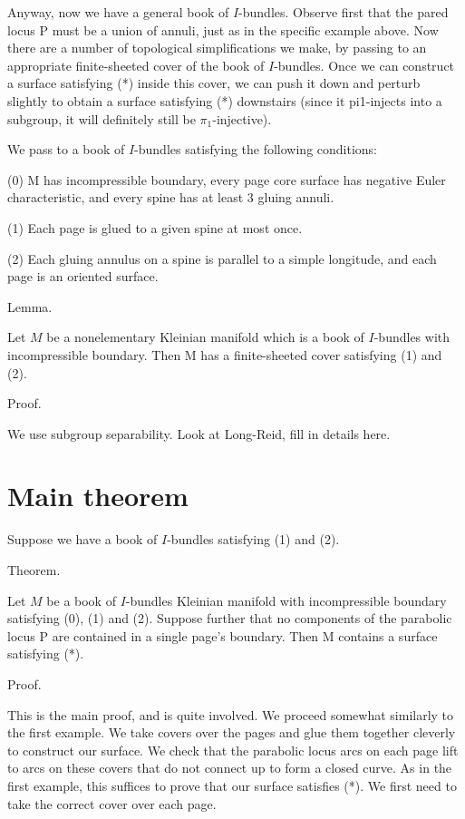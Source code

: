 \documentclass[12pt]{amsart}
\theoremstyle{definition}
\theoremstyle{remark}
\begin{document}
Anyway, now we have a general book of $I$-bundles. Observe first that the pared
locus P must be a union of annuli, just as in the specific example above.  Now
there are a number of topological simplifications we make, by passing to an
appropriate finite-sheeted cover of the book of $I$-bundles.  Once we can
construct a surface satisfying (*) inside this cover, we can push it down and
perturb slightly to obtain a surface satisfying (*) downstairs (since it
pi1-injects into a subgroup, it will definitely still be $\pi_1$-injective).

We pass to a book of $I$-bundles satisfying the following conditions:

(0) M has incompressible boundary, every page core surface has negative Euler
characteristic, and every spine has at least 3 gluing annuli.

(1) Each page is glued to a given spine at most once.

(2) Each gluing annulus on a spine is parallel to a simple longitude, and each
page is an oriented surface.

Lemma.

Let $M$ be a nonelementary Kleinian manifold which is a book of $I$-bundles with
incompressible boundary. Then M has a finite-sheeted cover satisfying (1) and
(2).

Proof.

We use subgroup separability. Look at Long-Reid, fill in details here.

\section{Main theorem}

Suppose we have a book of $I$-bundles satisfying (1) and (2).

Theorem.

Let $M$ be a book of $I$-bundles Kleinian manifold with incompressible boundary
satisfying (0), (1) and (2). Suppose further that no components of the
parabolic locus P are contained in a single page's boundary. Then M contains
a surface satisfying (*).

Proof.

This is the main proof, and is quite involved. We proceed somewhat similarly to
the first example. We take covers over the pages and glue them together
cleverly to construct our surface. We check that the parabolic locus arcs on
each page lift to arcs on these covers that do not connect up to form a closed
curve. As in the first example, this suffices to prove that our surface
satisfies (*). We first need to take the correct cover over each page.
\end{document}
